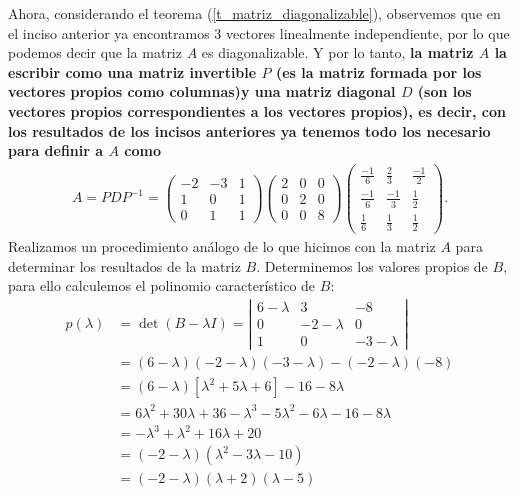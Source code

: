 \documentclass[11pt,letterpaper]{article}
\begin{document}
\begin{enumerate}
Ahora, considerando el teorema (\ref{t_matriz_diagonalizable}), observemos que en el inciso anterior ya encontramos 3 vectores linealmente independiente, por lo que podemos decir que la matriz $A$ es diagonalizable. Y por lo tanto, \textbf{ la matriz $A$ la escribir como una matriz invertible $P$ (es la matriz formada por los vectores propios como columnas)y una matriz diagonal $D$ (son los vectores propios correspondientes a los vectores propios), es decir, con los resultados de los incisos anteriores ya tenemos todo los necesario para definir a $A$ como}
\begin{align*}
A=PDP^{-1}=\begin{pmatrix}
-2 & -3 & 1 \\
1 & 0 & 1 \\
0 & 1 & 1
\end{pmatrix}\begin{pmatrix}
2 & 0 & 0 \\
0 & 2 & 0 \\
0 & 0 & 8
\end{pmatrix} \begin{pmatrix}
\frac{-1}{6} & \frac{2}{3} & \frac{-1}{2} \\
\frac{-1}{6} & \frac{-1}{3} & \frac{1}{2} \\
\frac{1}{6} & \frac{1}{3} & \frac{1}{2}
\end{pmatrix}.
\end{align*}
Realizamos un procedimiento análogo de lo que hicimos con la matriz $A$ para determinar los resultados de la matriz $B$. Determinemos los valores propios de $B$, para ello calculemos el polinomio característico de $B$:
\begin{align*}
p(\lambda) &= \det (B-\lambda I)=\left|\begin{array}{ccc}
6-\lambda & 3 & -8 \\
0& -2-\lambda & 0\\
1 & 0 & -3-\lambda
\end{array} \right|\\
&=(6-\lambda)(-2-\lambda)(-3-\lambda)-(-2-\lambda)(-8)\\
&=(6-\lambda)[\lambda^2+5\lambda+6]-16-8\lambda\\
&=6\lambda^2+30\lambda+36-\lambda^3-5\lambda^2-6\lambda-16-8\lambda \\
&=-\lambda^3+\lambda^2+16\lambda+20\\
&=(-2-\lambda)(\lambda^2-3\lambda-10)\\
&=(-2-\lambda)(\lambda+2)(\lambda-5)
\end{align*}

\end{enumerate}
\end{document}
